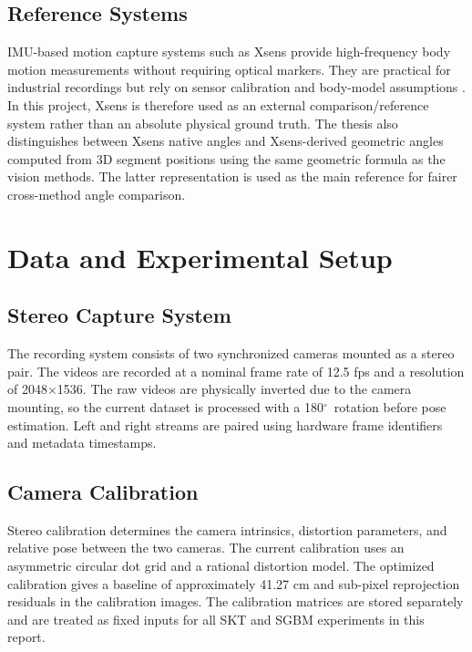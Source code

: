 \documentclass[12pt,a4paper]{article}
\newcommand{\degr}{\ensuremath{^\circ}}
\begin{document}
\subsection{Reference Systems}

IMU-based motion capture systems such as Xsens provide high-frequency body
motion measurements without requiring optical markers.
They are practical for industrial recordings but rely on sensor calibration and
body-model assumptions \cite{roetenberg2009xsens,filippeschi2017survey}.
In this project, Xsens is therefore used as an external comparison/reference
system rather than an absolute physical ground truth.
The thesis also distinguishes between Xsens native angles and Xsens-derived
geometric angles computed from 3D segment positions using the same geometric
formula as the vision methods.
The latter representation is used as the main reference for fairer
cross-method angle comparison.

\clearpage
\section{Data and Experimental Setup}
\label{sec:data_setup}

\subsection{Stereo Capture System}

The recording system consists of two synchronized cameras mounted as a stereo
pair.
The videos are recorded at a nominal frame rate of 12.5 fps and a resolution of
2048$\times$1536.
The raw videos are physically inverted due to the camera mounting, so the
current dataset is processed with a 180\degr\ rotation before pose estimation.
Left and right streams are paired using hardware frame identifiers and
metadata timestamps.

\subsection{Camera Calibration}

Stereo calibration determines the camera intrinsics, distortion parameters, and
relative pose between the two cameras.
The current calibration uses an asymmetric circular dot grid and a rational
distortion model.
The optimized calibration gives a baseline of approximately 41.27 cm and
sub-pixel reprojection residuals in the calibration images.
The calibration matrices are stored separately and are treated as fixed inputs
for all SKT and SGBM experiments in this report.
\end{document}
